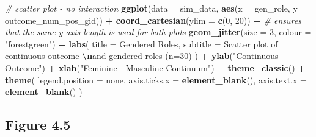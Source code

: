\documentclass[
]{book}
\newenvironment{Shaded}{\begin{snugshade}}{\end{snugshade}}
\newcommand{\AttributeTok}[1]{\textcolor[rgb]{0.13,0.29,0.53}{#1}}
\newcommand{\CommentTok}[1]{\textcolor[rgb]{0.56,0.35,0.01}{\textit{#1}}}
\newcommand{\DecValTok}[1]{\textcolor[rgb]{0.00,0.00,0.81}{#1}}
\newcommand{\FunctionTok}[1]{\textcolor[rgb]{0.13,0.29,0.53}{\textbf{#1}}}
\newcommand{\NormalTok}[1]{#1}
\newcommand{\SpecialCharTok}[1]{\textcolor[rgb]{0.81,0.36,0.00}{\textbf{#1}}}
\newcommand{\StringTok}[1]{\textcolor[rgb]{0.31,0.60,0.02}{#1}}
\begin{document}
\begin{Shaded}
\begin{Highlighting}[]
\CommentTok{\# scatter plot {-} no interaction}
\FunctionTok{ggplot}\NormalTok{(}\AttributeTok{data =}\NormalTok{ sim\_data, }\FunctionTok{aes}\NormalTok{(}\AttributeTok{x =}\NormalTok{ gen\_role, }\AttributeTok{y =}\NormalTok{ outcome\_num\_pos\_gid)) }\SpecialCharTok{+}
  \FunctionTok{coord\_cartesian}\NormalTok{(}\AttributeTok{ylim =} \FunctionTok{c}\NormalTok{(}\DecValTok{0}\NormalTok{, }\DecValTok{20}\NormalTok{)) }\SpecialCharTok{+} \CommentTok{\# ensures that the same y{-}axis length is used for both plots}
  \FunctionTok{geom\_jitter}\NormalTok{(}\AttributeTok{size =} \DecValTok{3}\NormalTok{, }\AttributeTok{colour =} \StringTok{"forestgreen"}\NormalTok{) }\SpecialCharTok{+}
  \FunctionTok{labs}\NormalTok{(}
    \AttributeTok{title =} \StringTok{\textquotesingle{}Gendered Roles\textquotesingle{}}\NormalTok{,}
    \AttributeTok{subtitle =} \StringTok{\textquotesingle{}Scatter plot of continuous outcome }\SpecialCharTok{\textbackslash{}n}\StringTok{and gendered roles (n=30)\textquotesingle{}}
\NormalTok{    ) }\SpecialCharTok{+}
  \FunctionTok{ylab}\NormalTok{(}\StringTok{"Continuous Outcome"}\NormalTok{) }\SpecialCharTok{+} \FunctionTok{xlab}\NormalTok{(}\StringTok{"Feminine {-} Masculine Continuum"}\NormalTok{) }\SpecialCharTok{+}
  \FunctionTok{theme\_classic}\NormalTok{() }\SpecialCharTok{+}
  \FunctionTok{theme}\NormalTok{(}
    \AttributeTok{legend.position =} \StringTok{\textquotesingle{}none\textquotesingle{}}\NormalTok{,}
    \AttributeTok{axis.ticks.x =} \FunctionTok{element\_blank}\NormalTok{(),}
    \AttributeTok{axis.text.x =} \FunctionTok{element\_blank}\NormalTok{()}
\NormalTok{  )}
\end{Highlighting}
\end{Shaded}

\subsection{Figure 4.5}\label{figure-4.5}
\end{document}
